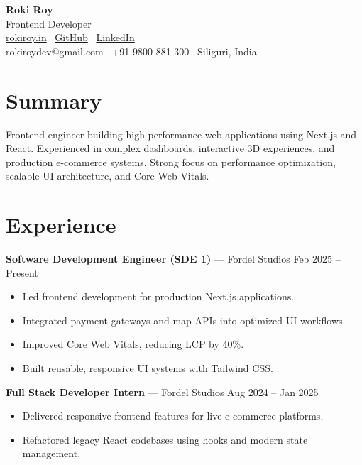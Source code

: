 \documentclass[10pt, letterpaper]{article}
\newenvironment{tightitem}{
    \begin{itemize}[topsep=1pt, itemsep=0.5pt, parsep=0pt, leftmargin=10pt]
}{
    \end{itemize}
}
\begin{document}
\begin{center}
{\fontsize{22pt}{22pt}\selectfont \textbf{Roki Roy}} \\[2pt]
Frontend Developer\\[2pt]
\href{https://rokiroy.in}{rokiroy.in} \textbullet\
\href{https://github.com/royroki}{GitHub} \textbullet\
\href{https://linkedin.com/in/rokiroy}{LinkedIn} \\
rokiroydev@gmail.com \textbullet\ +91 9800 881 300 \textbullet\ Siliguri, India
\end{center}

\section{Summary}

Frontend engineer building high-performance web applications using Next.js and React. Experienced in complex dashboards, interactive 3D experiences, and production e-commerce systems. Strong focus on performance optimization, scalable UI architecture, and Core Web Vitals.

\section{Experience}

\textbf{Software Development Engineer (SDE 1)} — Fordel Studios \hfill Feb 2025 -- Present  
\begin{tightitem}
\item Led frontend development for production Next.js applications.
\item Integrated payment gateways and map APIs into optimized UI workflows.
\item Improved Core Web Vitals, reducing LCP by 40\%.
\item Built reusable, responsive UI systems with Tailwind CSS.
\end{tightitem}

\textbf{Full Stack Developer Intern} — Fordel Studios \hfill Aug 2024 -- Jan 2025  
\begin{tightitem}
\item Delivered responsive frontend features for live e-commerce platforms.
\item Refactored legacy React codebases using hooks and modern state management.
\end{tightitem}
\end{document}
